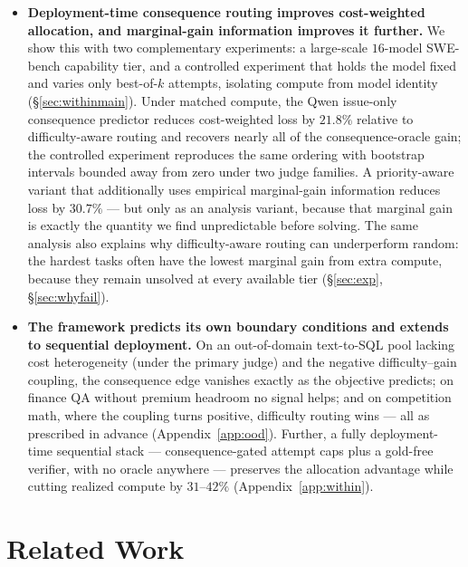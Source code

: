 \documentclass{article}
\begin{document}
\begin{itemize}
\item[(4)] \textbf{Deployment-time consequence routing improves
cost-weighted allocation, and marginal-gain information improves it
further.} We show this with two complementary experiments: a large-scale
$16$-model SWE-bench capability tier, and a controlled experiment that
holds the model fixed and varies only best-of-$k$ attempts, isolating
compute from model identity (\S\ref{sec:withinmain}). Under matched
compute, the Qwen issue-only consequence predictor reduces
cost-weighted loss by $21.8\%$ relative to difficulty-aware routing and
recovers nearly all of the consequence-oracle gain; the controlled
experiment reproduces the same ordering with bootstrap intervals
bounded away from zero under two judge families. A priority-aware
variant that additionally uses empirical marginal-gain information
reduces loss by $30.7\%$ --- but only as an analysis variant, because
that marginal gain is exactly the quantity we find unpredictable before
solving. The same analysis also explains why
difficulty-aware routing can underperform random: the hardest tasks
often have the lowest marginal gain from extra compute, because they
remain unsolved at every available tier (\S\ref{sec:exp},
\S\ref{sec:whyfail}).

\item[(5)] \textbf{The framework predicts its own boundary
conditions and extends to sequential deployment.} On an
out-of-domain text-to-SQL pool lacking cost heterogeneity (under
the primary judge) and the negative difficulty--gain coupling, the
consequence edge vanishes exactly as the objective predicts; on
finance QA without premium headroom no signal helps; and on
competition math, where the coupling turns positive, difficulty
routing wins --- all as prescribed in advance
(Appendix~\ref{app:ood}). Further, a
fully deployment-time sequential stack --- consequence-gated attempt
caps plus a gold-free verifier, with no oracle anywhere --- preserves
the allocation advantage while cutting realized compute by
$31$--$42\%$ (Appendix~\ref{app:within}).

\end{itemize}

\section{Related Work}
\end{document}
